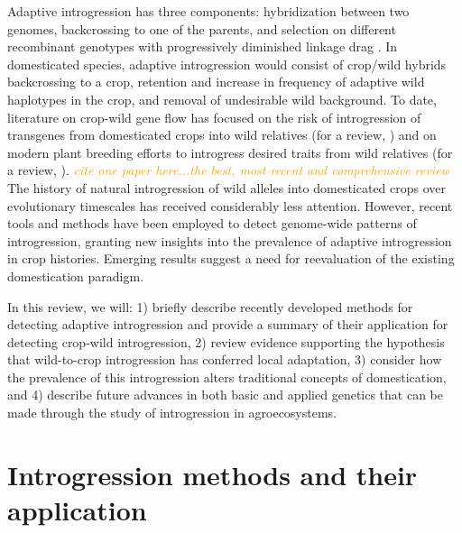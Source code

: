 \documentclass[11pt]{article}
\newcommand{\mbh}[1]{\textcolor{orange}{ \emph{\scriptsize  #1}} } %
\begin{document}
Adaptive introgression has three components: hybridization between two genomes, backcrossing to one of the parents, and selection on different recombinant genotypes with progressively diminished linkage drag \cite{barton2001role, Feuillet200824}.
In domesticated species, adaptive introgression would consist of crop/wild hybrids backcrossing to a crop, retention and increase in frequency of adaptive wild haplotypes in the crop, and removal of undesirable wild background.
To date, literature on crop-wild gene flow has focused on the risk of introgression of transgenes from domesticated crops into wild relatives (for a review, \cite{stewart2003transgene}) and on modern plant breeding efforts to introgress desired traits from wild relatives (for a review, \cite{zamir2001improving, tanksley1997seed, hajjar2007use}). \mbh{cite one paper here...the best, most recent and comprehensive review}
The history of natural introgression of wild alleles into domesticated crops over evolutionary timescales has received considerably less attention.
However, recent tools and methods have been employed to detect genome-wide patterns of introgression, granting new insights into the prevalence of adaptive introgression in crop histories.
Emerging results suggest a need for reevaluation of the existing domestication paradigm.


In this review, we will: 1) briefly describe recently developed methods for detecting adaptive introgression and provide a summary of their application for detecting crop-wild introgression, 2) review evidence supporting the hypothesis that wild-to-crop introgression has conferred local adaptation, 3) consider how the prevalence of this introgression alters traditional concepts of domestication, and 4) describe future advances in both basic and applied genetics that can be made through the study of introgression in agroecosystems.











\section*{Introgression methods and their application}
\end{document}

